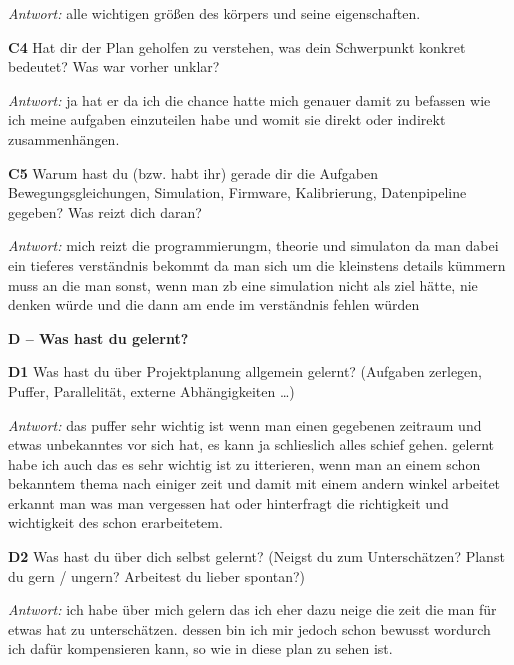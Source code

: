{\par\noindent\emph{Antwort:} alle wichtigen größen des körpers und seine eigenschaften.\par\smallskip
\par\noindent \textbf{C4} Hat dir der Plan geholfen zu verstehen, was dein Schwerpunkt konkret bedeutet? Was war vorher unklar?\par
\par\noindent\emph{Antwort:} ja hat er da ich die chance hatte mich genauer damit zu befassen wie ich meine aufgaben einzuteilen habe und womit sie direkt oder indirekt zusammenhängen.\par\smallskip
\par\noindent \textbf{C5} Warum hast du (bzw. habt ihr) gerade dir die Aufgaben Bewegungsgleichungen, Simulation, Firmware, Kalibrierung, Datenpipeline gegeben? Was reizt dich daran?\par
\par\noindent\emph{Antwort:} mich reizt die programmierungm, theorie und simulaton da man dabei ein tieferes verständnis bekommt da man sich um die kleinstens details kümmern muss an die man sonst, wenn man zb eine simulation nicht als ziel hätte, nie denken würde und die dann am ende im verständnis fehlen würden\par\smallskip
\par\medskip\noindent\textbf{D – Was hast du gelernt?}\par
\par\noindent \textbf{D1} Was hast du über Projektplanung allgemein gelernt? (Aufgaben zerlegen, Puffer, Parallelität, externe Abhängigkeiten …)\par
\par\noindent\emph{Antwort:} das puffer sehr wichtig ist wenn man einen gegebenen zeitraum und etwas unbekanntes vor sich hat, es kann ja schlieslich alles schief gehen. gelernt habe ich auch das es sehr wichtig ist zu itterieren, wenn man an einem schon bekanntem thema nach einiger zeit und damit mit einem andern winkel arbeitet erkannt man was man vergessen hat oder hinterfragt die richtigkeit und wichtigkeit des schon erarbeitetem.\par\smallskip
\par\noindent \textbf{D2} Was hast du über dich selbst gelernt? (Neigst du zum Unterschätzen? Planst du gern / ungern? Arbeitest du lieber spontan?)\par
\par\noindent\emph{Antwort:} ich habe über mich gelern das ich eher dazu neige die zeit die man für etwas hat zu unterschätzen. dessen bin ich mir jedoch schon bewusst wordurch ich dafür kompensieren kann, so wie in diese plan zu sehen ist.\par\smallskip
}
